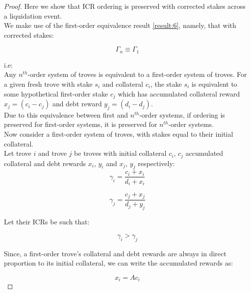 \documentclass[reqno]{article}
\begin{document}
\begin{proof}
Here we show that ICR ordering is preserved with corrected stakes across a liquidation event.\\

We make use of the first-order equivalence result \ref{result:6}, namely, that with corrected stakes:

\begin{equation} 
    \Gamma_n \equiv \Gamma_1
\end{equation}

i.e:\\

Any $n^{th}$-order system of troves is equivalent to a first-order system of troves. For a given fresh trove with stake $s_i$ and collateral $c_i$, the stake $s_i$ is equivalent to some hypothetical first-order stake $c_j$ which has accumulated collateral reward $x_j = (c_i - c_j)$ and debt reward $y_j = (d_i - d_j)$.\\

Due to this equivalence between first and $n^{th}$-order systems, if ordering is preserved for first-order systems, it is preserved for $n^{th}$-order systems.\\

Now consider a first-order system of troves, with stakes equal to their initial collateral.\\

Let trove $i$ and trove $j$ be troves with initial collateral $c_i$, $c_j$ accumulated collateral and debt rewards $x_i$, $y_i$ and $x_j$, $y_j$ respectively:\\

\begin{equation} 
    \gamma_i=\frac{c_i+x_i}{d_i+x_i}
\end{equation}

\begin{equation} 
    \gamma_j=\frac{c_j+x_j}{d_j+y_j}
\end{equation}

Let their ICRs be such that:

\begin{equation} 
    \gamma_i > \gamma_j
\end{equation}

\bigskip
Since, a first-order trove’s collateral and debt rewards are always in direct proportion to its initial collateral, we can write the accumulated rewards as:

\begin{equation} 
    x_i=Ac_i
\end{equation}


\end{proof}
\end{document}
